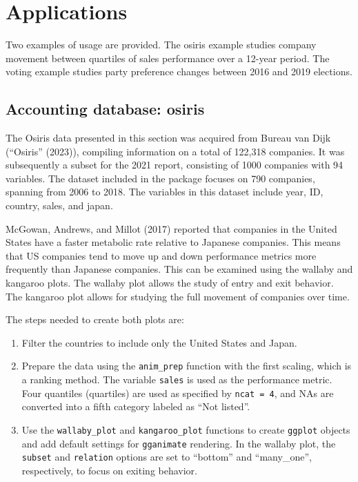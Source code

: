 \hypertarget{applications}{%
\section{Applications}\label{applications}}

Two examples of usage are provided. The osiris example studies company movement between quartiles of sales performance over a 12-year period. The voting example studies party preference changes between 2016 and 2019 elections.

\hypertarget{accounting-database-osiris}{%
\subsection{Accounting database: osiris}\label{accounting-database-osiris}}

The Osiris data presented in this section was acquired from Bureau van Dijk ({``Osiris''} (2023)), compiling information on a total of 122,318 companies. It was subsequently a subset for the 2021 report, consisting of 1000 companies with 94 variables. The dataset included in the package focuses on 790 companies, spanning from 2006 to 2018. The variables in this dataset include year, ID, country, sales, and japan.

McGowan, Andrews, and Millot (2017) reported that companies in the United States have a faster metabolic rate relative to Japanese companies. This means that US companies tend to move up and down performance metrics more frequently than Japanese companies. This can be examined using the wallaby and kangaroo plots. The wallaby plot allows the study of entry and exit behavior. The kangaroo plot allows for studying the full movement of companies over time.

The steps needed to create both plots are:

\begin{enumerate}
\def\labelenumi{\arabic{enumi}.}
\tightlist
\item
  Filter the countries to include only the United States and Japan.
\item
  Prepare the data using the \texttt{anim\_prep} function with the first scaling, which is a ranking method. The variable \texttt{sales} is used as the performance metric. Four quantiles (quartiles) are used as specified by \texttt{ncat\ =\ 4}, and NAs are converted into a fifth category labeled as ``Not listed''.
\item
  Use the \texttt{wallaby\_plot} and \texttt{kangaroo\_plot} functions to create \texttt{ggplot} objects and add default settings for \texttt{gganimate} rendering. In the wallaby plot, the \texttt{subset} and \texttt{relation} options are set to ``bottom'' and ``many\_one'', respectively, to focus on exiting behavior.
\end{enumerate}

